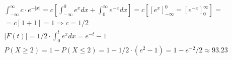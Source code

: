 \documentclass[a4paper]{article}
\begin{document}
\section{}
\subsection{}
\begin{align*}
& \int_{-\infty}^\infty c\cdot e^{-|x|} = c[ \int_{-\infty}^0 e^{x} dx + \int_0^{\infty} e^{-x} dx] = c[ [e^x]_{-\infty}^0 = [e^{-x}]_0^\infty] = \\
& = c [ 1 + 1] = 1 \Rightarrow c = 1/2 \\
& |F(t)| = 1/2 \cdot \int_0^t e^x dx = e^{-t} - 1 \\
& P(X \ge 2) = 1 - P(X \le 2) = 1 - 1/2 \cdot (e^2 - 1) = 1 - e^{-2}/2 \approx 93.23%
\end{align*}
\end{document}
